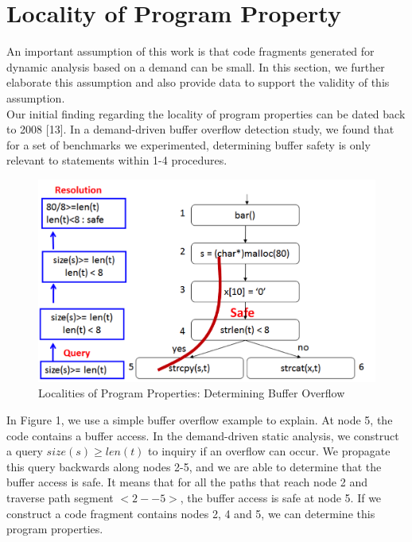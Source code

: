 \documentclass[12pt]{article}
\begin{document}
\section{Locality of Program Property}

An important assumption of this work is that code fragments generated for dynamic analysis based on a demand can be small. In this section, we further elaborate this assumption and also provide data to support the validity of this assumption. \\

Our initial finding regarding the locality of program properties can be dated back to 2008 [13]. In a demand-driven buffer overflow detection study, we found that for a set of benchmarks we experimented, determining buffer safety is only relevant to statements within 1-4 procedures. \\

\begin{figure}[H]
     \centering
     \includegraphics[width=5in]{buffer-overflow-example.png}
     \caption{Localities of Program Properties: Determining Buffer Overflow}
     \label{Buffer Overflow}
 \end{figure}

In Figure 1, we use a simple buffer overflow example to explain. At node 5, the code contains a buffer access. In the demand-driven static analysis, we construct a query $size(s) \geq len(t)$ to inquiry if an overflow can occur. We propagate this query backwards along nodes 2-5, and we are able to determine that the buffer access is safe. It means that for all the paths that reach node 2 and traverse path segment $<2--5>$, the buffer access is safe at node 5. If we construct a code fragment contains nodes 2, 4 and 5, we can determine this program properties.\\
\end{document}
